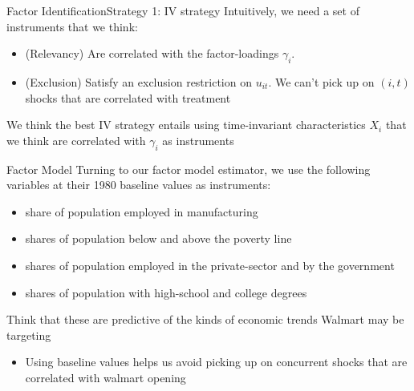 \documentclass[aspectratio=43,t,11pt]{beamer}
\begin{document}
\begin{frame}{Factor Identification}{Strategy 1: IV strategy}
  Intuitively, we need a set of instruments that we think:

  \begin{itemize}
    \item {\color{zinc500} (Relevancy)} Are correlated with the factor-loadings $\gamma_i$.

    \item {\color{zinc500} (Exclusion)} Satisfy an exclusion restriction on $u_{it}$. We can't pick up on $(i,t)$ shocks that are correlated with treatment
  \end{itemize}

  \bigskip
  We think the best IV strategy entails using time-invariant characteristics $X_i$ that we think are correlated with $\gamma_i$ as instruments
\end{frame}

\begin{frame}{Factor Model}
  Turning to our factor model estimator, we use the following variables at their 1980 baseline values as instruments:
  \begin{itemize}
    \item share of population employed in manufacturing
    \item shares of population below and above the poverty line
    \item shares of population employed in the private-sector and by the government
    \item shares of population with high-school and college degrees
  \end{itemize}

  \smallskip\pause
  Think that these are predictive of the kinds of economic trends Walmart may be targeting
  \begin{itemize}
    \item Using baseline values helps us avoid picking up on concurrent shocks that are correlated with walmart opening
  \end{itemize}
\end{frame}
\end{document}
